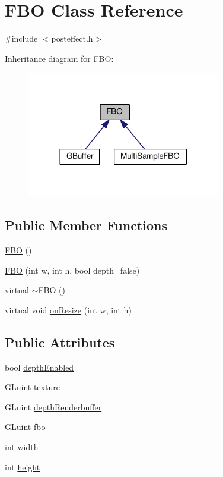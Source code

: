\hypertarget{class_f_b_o}{}\section{F\+B\+O Class Reference}
\label{class_f_b_o}


{\ttfamily \#include $<$posteffect.\+h$>$}



Inheritance diagram for F\+B\+O\+:
\nopagebreak
\begin{figure}[H]
\begin{center}
\leavevmode
\includegraphics[width=240pt]{class_f_b_o__inherit__graph}
\end{center}
\end{figure}
\subsection*{Public Member Functions}
\begin{DoxyCompactItemize}
\item 
\hyperlink{class_f_b_o_a1df00737c866f0ba5b9c561d0076b7ad}{F\+B\+O} ()
\item 
\hyperlink{class_f_b_o_a1969544d2a3d2225ab81dba96a642405}{F\+B\+O} (int w, int h, bool depth=false)
\item 
virtual \hyperlink{class_f_b_o_aa1dd3cace61baf9dd39b4bd1421d1813}{$\sim$\+F\+B\+O} ()
\item 
virtual void \hyperlink{class_f_b_o_a549d867aff12a3ccb0876552e9a42304}{on\+Resize} (int w, int h)
\end{DoxyCompactItemize}
\subsection*{Public Attributes}
\begin{DoxyCompactItemize}
\item 
bool \hyperlink{class_f_b_o_adb6831ca2de173a0f2fbeeed4e5fd96a}{depth\+Enabled}
\item 
G\+Luint \hyperlink{class_f_b_o_a37180796ba607460d9fd946122cb99c4}{texture}
\item 
G\+Luint \hyperlink{class_f_b_o_a0d534622dab7033e5a8c003f7eb7e468}{depth\+Renderbuffer}
\item 
G\+Luint \hyperlink{class_f_b_o_adfc8733f55f3cfa150e03d4b7f92bae9}{fbo}
\item 
int \hyperlink{class_f_b_o_a809c6cb2cd45dc68f14d59656490d95e}{width}
\item 
int \hyperlink{class_f_b_o_a8d4904691fd104e8435e999e9ab17528}{height}
\end{DoxyCompactItemize}


